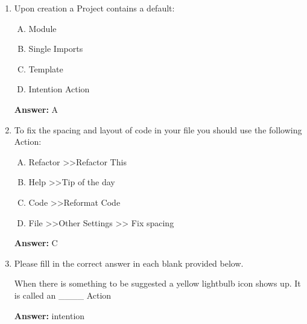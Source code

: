 \documentclass[12pt]{article}
\begin{document}
\begin{enumerate}[1.]
    \item

    Upon creation a Project contains a default:

    \bigskip

    \begin{enumerate}[A.]
        \item Module
        \item Single Imports
        \item Template
        \item Intention Action
    \end{enumerate}

    \bigskip

    \textbf{Answer:} A

    \item

    To fix the spacing and layout of code in your file you should use the
    following Action:

    \bigskip

    \begin{enumerate}[A.]
        \item Refactor \textgreater \textgreater Refactor This
        \item Help \textgreater \textgreater Tip of the day
        \item Code \textgreater \textgreater Reformat Code
        \item File \textgreater \textgreater Other Settings >> Fix spacing
    \end{enumerate}

    \bigskip

    \textbf{Answer:} C

    \item

    Please fill in the correct answer in each blank provided below.

    \bigskip

    When there is something to be suggested a yellow lightbulb icon shows up. It
    is called an \_\_\_\_  Action

    \bigskip

    \textbf{Answer:} intention

\end{enumerate}
\end{document}
